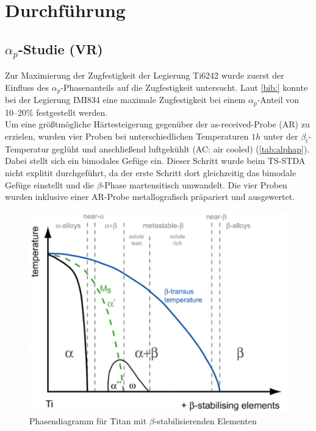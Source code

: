 \chapter{Durchführung}

\section{$\alpha_p$-Studie (VR)}
Zur Maximierung der Zugfestigkeit der Legierung Ti6242 wurde zuerst der Einfluss des $\alpha_p$-Phasenanteils auf die Zugfestigkeit untersucht. Laut \ref{bib:} konnte bei der Legierung IMI834 eine maximale Zugfestigkeit bei einem $\alpha_p$-Anteil von 10--20\% festgestellt werden. \\
Um eine größtmögliche Härtesteigerung gegenüber der as-received-Probe (AR) zu erzielen, wurden vier Proben bei unterschiedlichen Temperaturen $1h$ unter der $\beta_t$-Temperatur geglüht und anschließend luftgekühlt (AC: air cooled) (\ref{tab:alphap}). Dabei stellt sich ein bimodales Gefüge ein. Dieser Schritt wurde beim TS-STDA nicht explitit durchgeführt, da der erste Schritt dort gleichzeitig das bimodale Gefüge einstellt und die $\beta$-Phase martensitisch umwandelt. Die vier Proben wurden inklusive einer AR-Probe metallografisch präpariert und ausgewertet.



\begin{figure}[h]
	\includegraphics{Bilder/Phasendiagramm_beta.png}
	\caption{Phasendiagramm für Titan mit $\beta$-stabilisierenden Elementen}
	\label{fig:phadia}
\end{figure}



